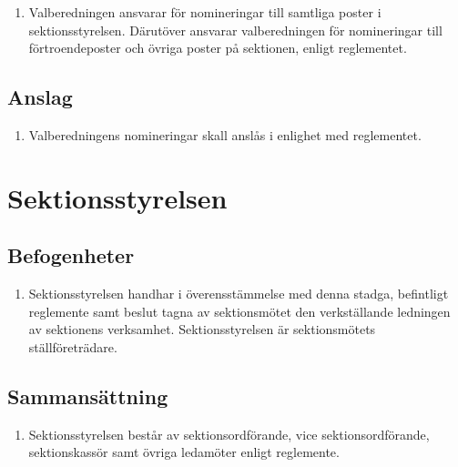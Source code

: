 \documentclass[11pt,a4paper]{article}
\begin{document}
\begin{enumerate}[\thesubsection .1]

  \item Valberedningen ansvarar för nomineringar till samtliga poster
  i sektionsstyrelsen. Därutöver ansvarar valberedningen för
  nomineringar till förtroendeposter och övriga poster på sektionen, enligt
  reglementet.

\end{enumerate}

\subsection{Anslag}

\begin{enumerate}[\thesubsection .1]

  \item Valberedningens nomineringar skall anslås i enlighet med reglementet.

\end{enumerate}


\newpage




\section{Sektionsstyrelsen}
\label{sektionsstyrelsen}
\subsection{Befogenheter}

\begin{enumerate}[\thesubsection .1]

  \item Sektionsstyrelsen handhar i överens\-stäm\-melse med denna stadga, befintligt reglemente samt beslut tagna av sektionsmötet den verk\-ställ\-ande ledningen av sektionens verksamhet. Sektionsstyrelsen är sektions\-mötets ställ\-före\-trädare.

\end{enumerate}

\subsection{Sammansättning}

\begin{enumerate}[\thesubsection .1]

  \item Sektionsstyrelsen består av sektionsordförande, vice sektionsordförande, sektionskassör samt övriga ledamöter enligt reglemente.
\end{enumerate}
\end{document}
